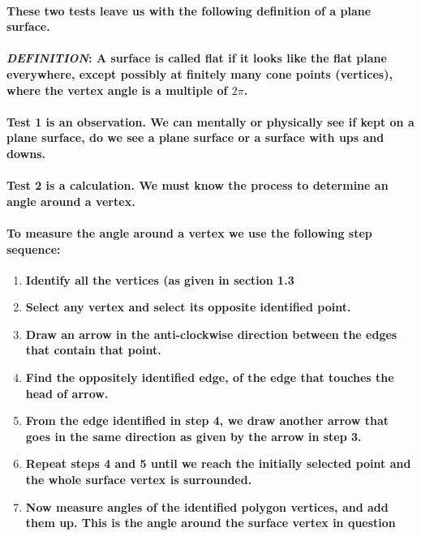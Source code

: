 \documentclass{report}
\begin{document}
\paragraph{These two tests leave us with the following definition of a plane surface.}



\paragraph{\textit{DEFINITION}: A surface is called flat if it looks like the flat plane everywhere, except possibly at finitely many cone points (vertices), where the vertex angle is a multiple of $2\pi$.}

\paragraph{Test 1 is an observation. We can mentally or physically see if kept on a plane surface, do we see a plane surface or a surface with ups and downs.}

\paragraph{Test 2 is a calculation. We must know the process to determine an angle around a vertex.}

\paragraph{To measure the angle around a vertex we use the following step sequence:}

\begin{enumerate}
\item \textbf{Identify all the vertices (as given in section 1.3}

\item \textbf{Select any vertex and select its opposite identified point.}

\item \textbf{Draw an arrow in the anti-clockwise direction between the edges that contain that point.}

\item \textbf{Find the oppositely identified edge, of the edge that touches the head of arrow.}

\item \textbf{From the edge identified in step 4, we draw another arrow that goes in the same direction as given by the arrow in step 3.}

\item \textbf{Repeat steps 4 and 5 until we reach the initially selected point and the whole surface vertex is surrounded.}

\item \textbf{Now measure angles of the identified polygon vertices, and add them up. This is the angle around the surface vertex in question}
\end{enumerate}
\end{document}
